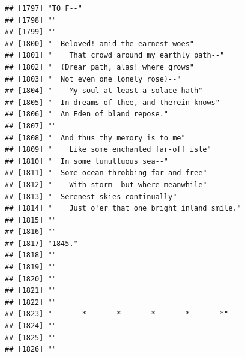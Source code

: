 \documentclass{article}\usepackage[]{graphicx}\usepackage[]{color}
\makeatletter
\newenvironment{kframe}{%
 \def\at@end@of@kframe{}%
 \ifinner\ifhmode%
  \def\at@end@of@kframe{\end{minipage}}%
  \begin{minipage}{\columnwidth}%
 \fi\fi%
 \def\FrameCommand##1{\hskip\@totalleftmargin \hskip-\fboxsep
 \colorbox{shadecolor}{##1}\hskip-\fboxsep
     \hskip-\linewidth \hskip-\@totalleftmargin \hskip\columnwidth}%
 \MakeFramed {\advance\hsize-\width
   \@totalleftmargin\z@ \linewidth\hsize
   \@setminipage}}%
 {\par\unskip\endMakeFramed%
 \at@end@of@kframe}
\newenvironment{knitrout}{}{} %
\makeatother
\begin{document}
\begin{knitrout}
\begin{kframe}
\begin{verbatim}
## [1797] "TO F--"                                                                      
## [1798] ""                                                                            
## [1799] ""                                                                            
## [1800] "  Beloved! amid the earnest woes"                                            
## [1801] "    That crowd around my earthly path--"                                     
## [1802] "  (Drear path, alas! where grows"                                            
## [1803] "  Not even one lonely rose)--"                                               
## [1804] "    My soul at least a solace hath"                                          
## [1805] "  In dreams of thee, and therein knows"                                      
## [1806] "  An Eden of bland repose."                                                  
## [1807] ""                                                                            
## [1808] "  And thus thy memory is to me"                                              
## [1809] "    Like some enchanted far-off isle"                                        
## [1810] "  In some tumultuous sea--"                                                  
## [1811] "  Some ocean throbbing far and free"                                         
## [1812] "    With storm--but where meanwhile"                                         
## [1813] "  Serenest skies continually"                                                
## [1814] "    Just o'er that one bright inland smile."                                 
## [1815] ""                                                                            
## [1816] ""                                                                            
## [1817] "1845."                                                                       
## [1818] ""                                                                            
## [1819] ""                                                                            
## [1820] ""                                                                            
## [1821] ""                                                                            
## [1822] ""                                                                            
## [1823] "       *       *       *       *       *"                                    
## [1824] ""                                                                            
## [1825] ""                                                                            
## [1826] ""                                                                            

\end{verbatim}
\end{kframe}
\end{knitrout}
\end{document}

